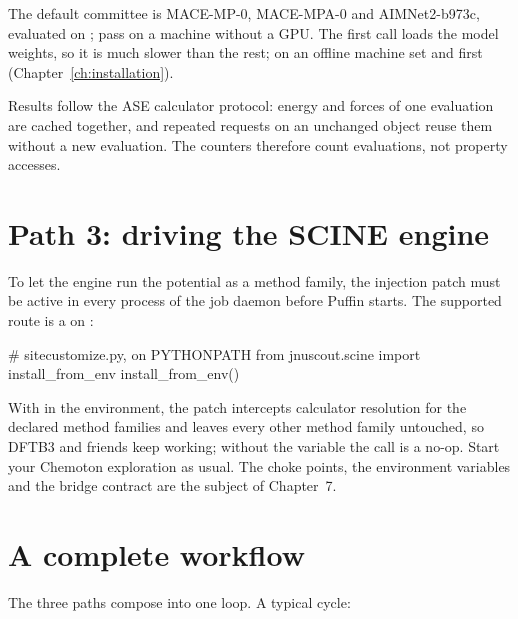 \begin{notebox}
The default committee is MACE-MP-0, MACE-MPA-0 and AIMNet2-b973c, evaluated
on ; pass  on a machine without a GPU.
The first call loads the model weights, so it is much slower than the rest; on
an offline machine set  and 
first (Chapter~\ref{ch:installation}).
\end{notebox}

\begin{notebox}[Caching]
Results follow the ASE calculator protocol: energy and forces of one
evaluation are cached together, and repeated requests on an unchanged
 object reuse them without a new evaluation.  The counters
therefore count evaluations, not property accesses.
\end{notebox}

\section{Path 3: driving the SCINE engine}

To let the engine run the potential as a method family, the injection patch
must be active in every process of the job daemon before Puffin starts.  The
supported route is a  on :

\begin{codeblock}
# sitecustomize.py, on PYTHONPATH
from jnuscout.scine import install_from_env
install_from_env()
\end{codeblock}

With  in the environment, the patch intercepts
calculator resolution for the declared method families and leaves every other
method family untouched, so DFTB3 and friends keep working; without the
variable the call is a no-op.  Start your Chemoton exploration as usual.  The
choke points, the environment variables and the bridge contract are the
subject of Chapter~7.

\section{A complete workflow}

The three paths compose into one loop.  A typical cycle:

